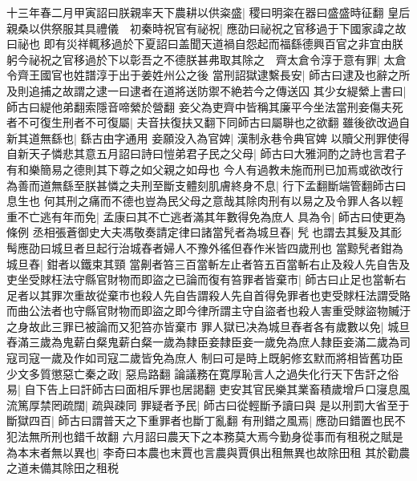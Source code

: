 十三年春二月甲寅詔曰朕親率天下農耕以供粢盛|{
	稷曰明粢在器曰盛盛時征翻}
皇后親桑以供祭服其具禮儀　初秦時祝官有祕祝|{
	應劭曰祕祝之官移過于下國家諱之故曰祕也}
即有災祥輒移過於下夏詔曰盖聞天道禍自怨起而福繇德興百官之非宜由朕躬今祕祝之官移過於下以彰吾之不德朕甚弗取其除之　齊太倉令淳于意有罪|{
	太倉令齊王國官也姓譜淳于出于姜姓州公之後}
當刑詔獄逮繫長安|{
	師古曰逮及也辭之所及則追捕之故謂之逮一曰逮者在道將送防禦不絶若今之傳送囚}
其少女緹縈上書曰|{
	師古曰緹他弟翻索隱音啼縈於營翻}
妾父為吏齊中皆稱其廉平今坐法當刑妾傷夫死者不可復生刑者不可復屬|{
	夫音扶復扶又翻下同師古曰屬聨也之欲翻}
雖後欲改過自新其道無繇也|{
	繇古由字通用}
妾願没入為官婢|{
	漢制永巷令典官婢}
以贖父刑罪使得自新天子憐悲其意五月詔曰詩曰愷弟君子民之父母|{
	師古曰大雅泂酌之詩也言君子有和樂簡易之德則其下尊之如父親之如母也}
今人有過教未施而刑已加焉或欲改行為善而道無繇至朕甚憐之夫刑至斷支體刻肌膚終身不息|{
	行下孟翻斷端管翻師古曰息生也}
何其刑之痛而不德也豈為民父母之意哉其除肉刑有以易之及令罪人各以輕重不亡逃有年而免|{
	孟康曰其不亡逃者滿其年數得免為庶人}
具為令|{
	師古曰使更為條例}
丞相張蒼御史大夫馮敬奏請定律曰諸當髠者為城旦舂|{
	髠也謂去其髮及其耏髩應劭曰城旦者旦起行治城舂者婦人不豫外徭但舂作米皆四歲刑也}
當黥髠者鉗為城旦舂|{
	鉗者以鐵束其頸}
當劓者笞三百當斬左止者笞五百當斬右止及殺人先自吿及吏坐受賕枉法守縣官財物而即盜之已論而復有笞罪者皆棄市|{
	師古曰止足也當斬右足者以其罪次重故從棄市也殺人先自告謂殺人先自首得免罪者也吏受賕枉法謂受賂而曲公法者也守縣官財物而即盜之即今律所謂主守自盜者也殺人害重受賕盜物贓汙之身故此三罪已被論而又犯笞亦皆棄市}
罪人獄已决為城旦舂者各有歲數以免|{
	城旦舂滿三歲為鬼薪白粲鬼薪白粲一歲為隸臣妾隸臣妾一歲免為庶人隸臣妾滿二歲為司寇司寇一歲及作如司寇二歲皆免為庶人}
制曰可是時上既躬修玄默而將相皆舊功臣少文多質懲惡亡秦之政|{
	惡烏路翻}
論議務在寛厚恥言人之過失化行天下吿訐之俗易|{
	自下告上曰訐師古曰面相斥罪也居謁翻}
吏安其官民樂其業畜積歲增戶口寖息風流篤厚禁罔疏闊|{
	疏與疎同}
罪疑者予民|{
	師古曰從輕斷予讀曰與}
是以刑罰大省至于斷獄四百|{
	師古曰謂普天之下重罪者也斷丁亂翻}
有刑錯之風焉|{
	應劭曰錯置也民不犯法無所刑也錯千故翻}
六月詔曰農天下之本務莫大焉今勤身從事而有租税之賦是為本末者無以異也|{
	李奇曰本農也末賈也言農與賈俱出租無異也故除田租}
其於勸農之道未備其除田之租税

